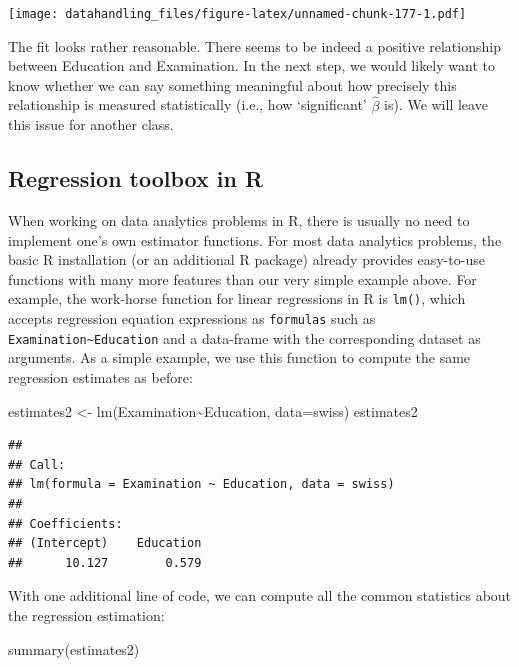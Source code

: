 \documentclass[
  12pt,
]{style/krantz}
\newenvironment{Shaded}{\begin{snugshade}}{\end{snugshade}}
\newcommand{\AttributeTok}[1]{\textcolor[rgb]{0.77,0.63,0.00}{#1}}
\newcommand{\FunctionTok}[1]{\textcolor[rgb]{0.00,0.00,0.00}{#1}}
\newcommand{\NormalTok}[1]{#1}
\newcommand{\OtherTok}[1]{\textcolor[rgb]{0.56,0.35,0.01}{#1}}
\newcommand{\SpecialCharTok}[1]{\textcolor[rgb]{0.00,0.00,0.00}{#1}}
\begin{document}
\texttt{[image: datahandling\_files/figure-latex/unnamed-chunk-177-1.pdf]}

The fit looks rather reasonable. There seems to be indeed a positive relationship between Education and Examination. In the next step, we would likely want to know whether we can say something meaningful about how precisely this relationship is measured statistically (i.e., how `significant' \(\hat{\beta}\) is). We will leave this issue for another class.

\hypertarget{regression-toolbox-in-r}{%
\subsection{Regression toolbox in R}\label{regression-toolbox-in-r}}

When working on data analytics problems in R, there is usually no need to implement one's own estimator functions. For most data analytics problems, the basic R installation (or an additional R package) already provides easy-to-use functions with many more features than our very simple example above. For example, the work-horse function for linear regressions in R is \texttt{lm()}, which accepts regression equation expressions as \texttt{formulas} such as \texttt{Examination\textasciitilde{}Education} and a data-frame with the corresponding dataset as arguments. As a simple example, we use this function to compute the same regression estimates as before:

\begin{Shaded}
\begin{Highlighting}[]
\NormalTok{estimates2 }\OtherTok{\textless{}{-}} \FunctionTok{lm}\NormalTok{(Examination}\SpecialCharTok{\textasciitilde{}}\NormalTok{Education, }\AttributeTok{data=}\NormalTok{swiss)}
\NormalTok{estimates2}
\end{Highlighting}
\end{Shaded}

\begin{verbatim}
## 
## Call:
## lm(formula = Examination ~ Education, data = swiss)
## 
## Coefficients:
## (Intercept)    Education  
##      10.127        0.579
\end{verbatim}

With one additional line of code, we can compute all the common statistics about the regression estimation:

\begin{Shaded}
\begin{Highlighting}[]
\FunctionTok{summary}\NormalTok{(estimates2)}
\end{Highlighting}
\end{Shaded}
\end{document}
